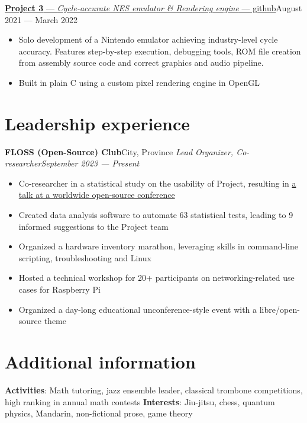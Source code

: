 \documentclass{article}
\newcommand{\newrole}[4]{
    {\normalfont\textbf{#1}\hfill#3}
    \newline
    \textit{#2}\hfill\textit{#4}
}
\newcommand{\shortlinkrole}[5]{
    {\href{#3}{\normalfont\textbf{#1} --- \textit{#2} --- #4\:\faExternalLink}\hfill#5\vspace*{-4pt}}
}
\newenvironment{bulletpoints}{\begin{itemize}\setlength\itemsep{-0.2em}}{\end{itemize}}
\begin{document}
\shortlinkrole{Project 3}{Cycle-accurate NES emulator \& Rendering engine}{https://github.com/github}{github}{August 2021 --- March 2022}
\begin{bulletpoints}
    \item Solo development of a Nintendo emulator achieving industry-level cycle accuracy. Features step-by-step execution, debugging tools, ROM file creation from assembly source code and correct graphics and audio pipeline.
    \item Built in plain C using a custom pixel rendering engine in OpenGL
\end{bulletpoints}


\section*{Leadership experience}
\newrole{FLOSS (Open-Source) Club}{Lead Organizer, Co-researcher}{City, Province}{September 2023 --- Present}
\begin{bulletpoints}
    \item Co-researcher in a statistical study on the usability of Project, resulting in \href{https://test.com}{a talk at a worldwide open-source conference}
    \item Created data analysis software to automate 63 statistical tests, leading to 9 informed suggestions to the Project team
    \item Organized a hardware inventory marathon, leveraging skills in command-line scripting, troubleshooting and Linux
    \item Hosted a technical workshop for 20+ participants on networking-related use cases for Raspberry Pi
    \item Organized a day-long educational unconference-style event with a libre/open-source theme
\end{bulletpoints}


\section*{Additional information}
{\bfseries Activities}: Math tutoring, jazz ensemble leader, classical trombone competitions, high ranking in annual math contests
\newline
{\bfseries Interests}: Jiu-jitsu, chess, quantum physics, Mandarin, non-fictional prose, game theory
\end{document}
